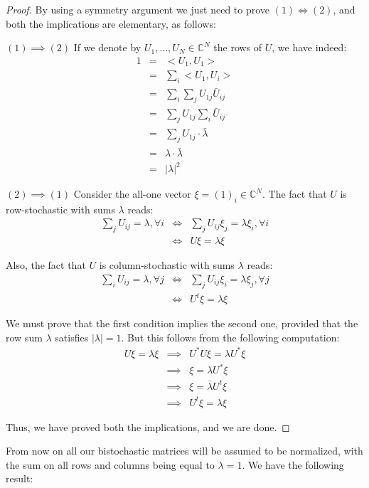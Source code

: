 \documentclass[12pt]{amsbook}
\begin{document}
\begin{proof}
By using a symmetry argument we just need to prove $(1)\iff(2)$, and both the implications are elementary, as follows:

\medskip

$(1)\implies(2)$ If we denote by $U_1,\ldots,U_N\in\mathbb C^N$ the rows of $U$, we have indeed:
\begin{eqnarray*}
1
&=&<U_1,U_1>\\
&=&\sum_i<U_1,U_i>\\
&=&\sum_i\sum_jU_{1j}\bar{U}_{ij}\\
&=&\sum_jU_{1j}\sum_i\bar{U}_{ij}\\
&=&\sum_jU_{1j}\cdot\bar{\lambda}\\
&=&\lambda\cdot\bar{\lambda}\\
&=&|\lambda|^2
\end{eqnarray*}

$(2)\implies(1)$ Consider the all-one vector $\xi=(1)_i\in\mathbb C^N$. The fact that $U$ is row-stochastic with sums $\lambda$ reads:
\begin{eqnarray*}
\sum_jU_{ij}=\lambda,\forall i
&\iff&\sum_jU_{ij}\xi_j=\lambda\xi_i,\forall i\\
&\iff&U\xi=\lambda\xi
\end{eqnarray*}

Also, the fact that $U$ is column-stochastic with sums $\lambda$ reads:
\begin{eqnarray*}
\sum_iU_{ij}=\lambda,\forall j
&\iff&\sum_jU_{ij}\xi_i=\lambda\xi_j,\forall j\\
&\iff&U^t\xi=\lambda\xi
\end{eqnarray*}

We must prove that the first condition implies the second one, provided that the row sum $\lambda$ satisfies $|\lambda|=1$. But this follows from the following computation:
\begin{eqnarray*}
U\xi=\lambda\xi
&\implies&U^*U\xi=\lambda U^*\xi\\
&\implies&\xi=\lambda U^*\xi\\
&\implies&\xi=\bar{\lambda}U^t\xi\\
&\implies&U^t\xi=\lambda\xi
\end{eqnarray*}

Thus, we have proved both the implications, and we are done.
\end{proof}

From now on all our bistochastic matrices will be assumed to be normalized, with the sum on all rows and columns being equal to $\lambda=1$. We have the following result:
\end{document}
